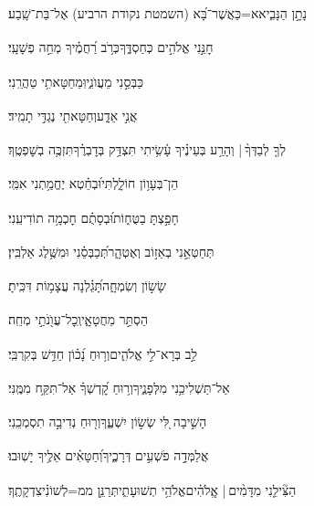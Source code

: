 \documentclass[12pt]{article}
\newcommand{\loc}[1]{\textsuperscript{\locf{#1}}}
\begin{document}
{\loc{ ב}~}‏ נָתָ֣ן הַנָּבִ֑יא{\hfill}א=כַּאֲשֶׁר־בָּ֝א (השמטת נקודת הרביע) אֶל־בַּת־שָֽׁבַע׃\par

{\loc{ ג}~}‏חׇנֵּ֣נִי אֱלֹהִ֣ים כְּחַסְדֶּ֑ךָ{\hfill}כְּרֹ֥ב רַ֝חֲמֶ֗יךָ מְחֵ֣ה פְשָׁעָֽי׃\par

{\loc{ ד}~}‏ כַּבְּסֵ֣נִי מֵעֲוֺנִ֑י{\hfill}וּֽמֵחַטָּאתִ֥י טַהֲרֵֽנִי׃\par

{\loc{ ה}~}‏ אֲנִ֣י אֵדָ֑ע{\hfill}וְחַטָּאתִ֖י נֶגְדִּ֣י תָמִֽיד׃\par

{\loc{ ו}~}‏לְךָ֤ לְבַדְּךָ֨ |  {\hfill}וְהָרַ֥ע בְּעֵינֶ֗יךָ עָ֫שִׂ֥יתִי\newline\hspace*{.5em} תִּצְדַּ֥ק בְּדׇבְרֶ֗ךָ{\hfill}תִּזְכֶּ֥ה בְשׇׁפְטֶֽךָ׃\par

{\loc{ ז}~}‏הֵן־בְּעָו֥וֹן חוֹלָ֑לְתִּי{\hfill}וּ֝בְחֵ֗טְא יֶחֱמַ֥תְנִי אִמִּֽי׃\par

{\loc{ ח}~}‏ חָפַ֣צְתָּ בַטֻּח֑וֹת{\hfill}וּ֝בְסָתֻ֗ם חׇכְמָ֥ה תוֹדִיעֵֽנִי׃\par

{\loc{ ט}~}‏תְּחַטְּאֵ֣נִי בְאֵז֣וֹב וְאֶטְהָ֑ר{\hfill}תְּ֝כַבְּסֵ֗נִי וּמִשֶּׁ֥לֶג אַלְבִּֽין׃\par

{\loc{ י}~}‏ שָׂשׂ֣וֹן וְשִׂמְחָ֑ה{\hfill}תָּ֝גֵ֗לְנָה עֲצָמ֥וֹת דִּכִּֽיתָ׃\par

{\loc{ יא}~}‏הַסְתֵּ֣ר  מֵחֲטָאָ֑י{\hfill}וְֽכׇל־עֲוֺ֖נֹתַ֣י מְחֵֽה׃\par

{\loc{ יב}~}‏לֵ֣ב  בְּרָא־לִ֣י אֱלֹהִ֑ים{\hfill}וְר֥וּחַ נָ֝כ֗וֹן חַדֵּ֥שׁ בְּקִרְבִּֽי׃\par

{\loc{ יג}~}‏אַל־תַּשְׁלִיכֵ֥נִי מִלְּפָנֶ֑יךָ{\hfill}וְר֥וּחַ קׇ֝דְשְׁךָ֗ אַל־תִּקַּ֥ח מִמֶּֽנִּי׃\par

{\loc{ יד}~}‏הָשִׁ֣יבָה לִּ֭י שְׂשׂ֣וֹן יִשְׁעֶ֑ךָ{\hfill}וְר֖וּחַ נְדִיבָ֣ה תִסְמְכֵֽנִי׃\par

{\loc{ טו}~}‏אֲלַמְּדָ֣ה פֹשְׁעִ֣ים דְּרָכֶ֑יךָ{\hfill}וְ֝חַטָּאִ֗ים אֵלֶ֥יךָ יָשֽׁוּבוּ׃\par

{\loc{ טז}~}‏הַצִּ֘ילֵ֤נִי מִדָּמִ֨ים |  אֱֽלֹהִ֗ים{\hfill}אֱלֹהֵ֥י תְשׁוּעָתִ֑י\newline\hspace*{.5em}תְּרַנֵּ֥ן ממ=לְשׁוֹנִ֗י{\hfill}צִדְקָתֶֽךָ׃\par
\end{document}
